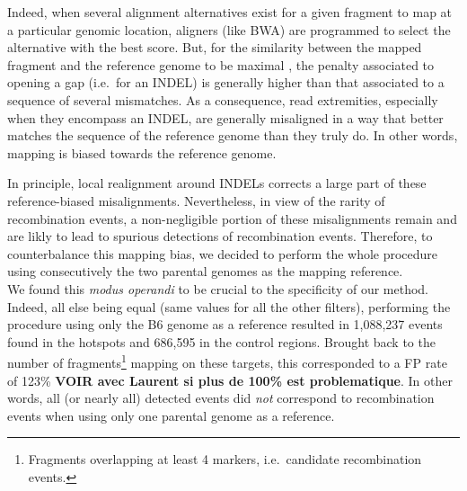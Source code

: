 Indeed, when several alignment alternatives exist for a given fragment to map at a particular genomic location, aligners (like BWA) are programmed to select the alternative with the best score.
But, for the similarity between the mapped fragment and the reference genome to be maximal \citep{smith1981identification}, the penalty associated to opening a gap (i.e.\ for an INDEL) is generally higher than that associated to a sequence of several mismatches.
As a consequence, read extremities, especially when they encompass an INDEL, are generally misaligned in a way that better matches the sequence of the reference genome than they truly do.
In other words, mapping is biased towards the reference genome.

In principle, local realignment around INDELs corrects a large part of these reference-biased misalignments.
Nevertheless, in view of the rarity of recombination events, a non-negligible portion of these misalignments remain and are likly to lead to spurious detections of recombination events.
Therefore, to counterbalance this mapping bias, we decided to perform the whole procedure using consecutively the two parental genomes as the mapping reference.\\


We found this \textit{modus operandi} to be crucial to the specificity of our method.
Indeed, all else being equal (same values for all the other filters), performing the procedure using only the B6 genome as a reference resulted in 1,088,237 events found in the hotspots and 686,595 in the control regions. Brought back to the number of fragments\footnote{Fragments overlapping at least 4 markers, i.e.\ candidate recombination events.} mapping on these targets, this corresponded to a FP rate of 123\% \textbf{VOIR avec Laurent si plus de 100\% est problematique}.
In other words, all (or nearly all) detected events did \textit{not} correspond to recombination events when using only one parental genome as a reference.

